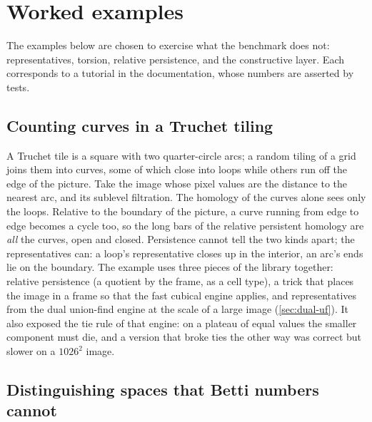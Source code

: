 \section{Worked examples}\label{sec:showcases}

The examples below are chosen to exercise what the benchmark does not: representatives, torsion, relative persistence, and the
constructive layer. Each corresponds to a tutorial in the documentation, whose numbers are asserted by tests.

\subsection{Counting curves in a Truchet tiling}\label{sec:truchet}

A Truchet tile is a square with two quarter-circle arcs; a random tiling of a grid joins them into curves, some of which close
into loops while others run off the edge of the picture. Take the image whose pixel values are the distance to the nearest arc, and
its sublevel filtration. The homology of the curves alone sees only the loops. Relative to the boundary of the picture,
a curve running from edge to edge becomes a cycle too, so the long bars of the relative persistent homology are \emph{all} the
curves, open and closed. Persistence cannot tell the two kinds apart; the representatives can: a loop's representative closes
up in the interior, an arc's ends lie on the boundary. The example uses three pieces of the library together: relative
persistence (a quotient by the frame, as a cell type), a trick that places the image in a frame so that the fast cubical engine
applies, and representatives from the dual union-find engine at the scale of a large image
(\cref{sec:dual-uf}). It also exposed the tie rule of that engine: on a plateau of equal values the smaller component must die,
and a version that broke ties the other way was correct but  slower on a $1026^2$ image.

\subsection{Distinguishing spaces that Betti numbers cannot}\label{sec:telling}

